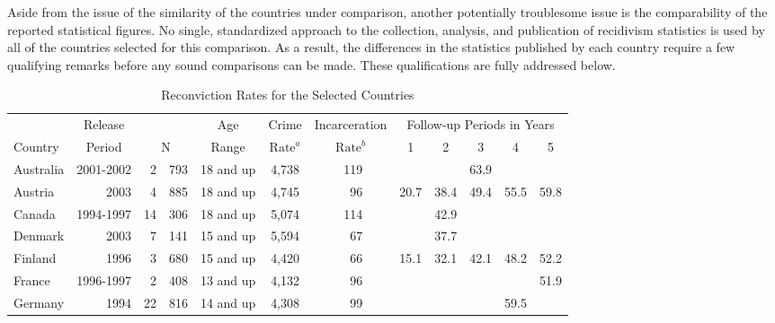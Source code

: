 Aside from the issue of the similarity of the countries under comparison, another potentially troublesome issue is the comparability of the reported statistical figures.  No single, standardized approach to the collection, analysis, and publication of recidivism statistics is used by all of the countries selected for this comparison.  As a result, the differences in the statistics published by each country require a few qualifying remarks before any sound comparisons can be made.  These qualifications are fully addressed below.

\begin{table}
\begin{center}
\caption{Reconviction Rates for the Selected Countries}
\vspace{0.1cm}
\small
\begin{tabular}{lrr@{,}lrcrrccccc}
  \hline
  & \multicolumn{1}{c}{Release} & \multicolumn{2}{c}{} & \multicolumn{1}{c}{Age} & Crime & \multicolumn{2}{c}{Incarceration} & \multicolumn{5}{c}{Follow-up Periods in Years} \\ \cline{9-13}
  Country & \multicolumn{1}{c}{Period}  & \multicolumn{2}{c}{N} & \multicolumn{1}{c}{Range} & $\mbox{Rate}^a$ & \multicolumn{2}{c}{$\mbox{Rate}^b$} & 1 & 2 & 3 & 4 & 5  \\ \hline
  \vspace{0.1cm} Australia & 2001-2002 &  2 & 793 & 18 and up & 4,738 & 119 & &   &   & 63.9 &  &  \\
  \vspace{0.1cm} Austria & 2003 & 4 & 885 & 18 and up & 4,745 & \hspace{0.82cm} 96 & & 20.7 & 38.4 & 49.4 & 55.5 & 59.8 \\
  \vspace{0.1cm} Canada  & 1994-1997 & 14 & 306 & 18 and up & 5,074 & 114 & & & 42.9 & & & \\
  \vspace{0.1cm} Denmark &      2003 &  7 & 141 & 15 and up & 5,594 & 67  & & & 37.7 & & & \\
  \vspace{0.1cm} Finland &      1996 &  3 & 680 & 15 and up & 4,420 & 66  & & 15.1 & 32.1 & 42.1 & 48.2 & 52.2  \\
  \vspace{0.1cm} France  & 1996-1997 &  2 & 408 & 13 and up & 4,132 & 96  & & & & & & 51.9   \\
  \vspace{0.1cm} Germany &      1994 & 22 & 816 & 14 and up & 4,308 & 99  & & & & & 59.5 &  \\

\end{tabular}
\end{center}
\end{table}
